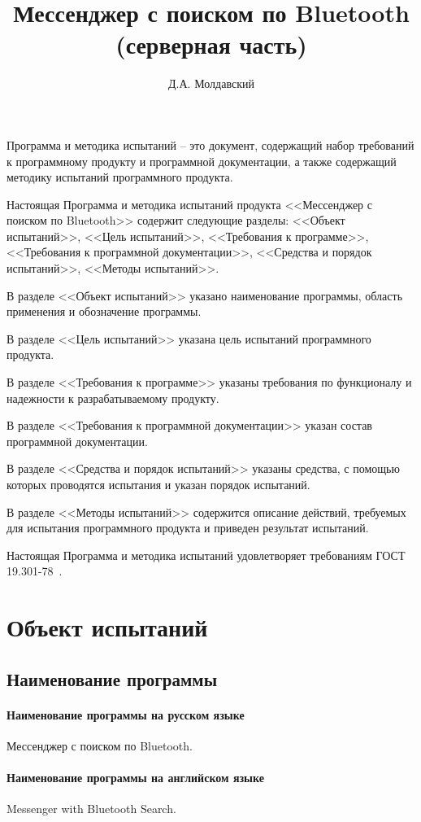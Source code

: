 \documentclass[testmethods]{espd}
\author{Д.А. Молдавский}
\title{Мессенджер с поиском по Bluetooth\\(серверная часть)}
\begin{document}
\annotation

Программа и методика испытаний -- это документ, содержащий набор требований к программному продукту и программной документации, а также содержащий методику испытаний программного продукта.

Настоящая Программа и методика испытаний продукта <<Мессенджер с поиском по Bluetooth>> содержит следующие разделы: <<Объект испытаний>>, <<Цель испытаний>>, <<Требования к программе>>, <<Требования к программной документации>>, <<Средства и порядок испытаний>>, <<Методы испытаний>>.

В разделе <<Объект испытаний>> указано наименование программы, область применения и обозначение программы.

В разделе <<Цель испытаний>> указана цель испытаний программного продукта.

В разделе <<Требования к программе>> указаны требования по функционалу и надежности к разрабатываемому продукту.

В разделе <<Требования к программной документации>> указан состав программной документации.

В разделе <<Средства и порядок испытаний>> указаны средства, с помощью которых проводятся испытания и указан порядок испытаний.

В разделе <<Методы испытаний>> содержится описание действий, требуемых для испытания программного продукта и приведен результат испытаний.

Настоящая Программа и методика испытаний удовлетворяет требованиям ГОСТ 19.301-78~\cite{espd301}.

\tableofcontents

\section{Объект испытаний}
\subsection{Наименование программы}
\paragraph{Наименование программы на русском языке}
Мессенджер с поиском по Bluetooth.
\paragraph{Наименование программы на английском языке}
Messenger with Bluetooth Search.
\end{document}
